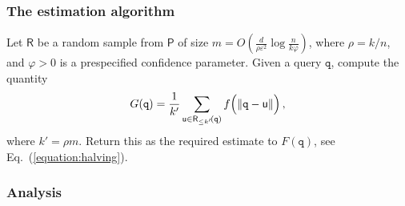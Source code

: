 \documentclass[12pt]{article}
\theoremstyle{remark}{\theorembodyfont{\rm} \newtheorem{remark}[theorem]{Remark}}
\newcommand{\eqlab}[1]{\label{equation:#1}}
\newcommand{\Eqref}[1]{Eq.~(\ref{equation:#1})}
\newcommand{\MakeBig}{\rule[-.2cm]{0cm}{0.4cm}}
\newcommand{\pth}[2][\!]{#1\left({#2}\right)}
\newcommand{\normY}[2]{\left\lVert {#1} - {#2} \right \rVert}
\newcommand{\eps}{{\varepsilon}}\newcommand{\divides}{|}
\newcommand{\PntSet}{\mathsf{P}}
\newcommand{\query}{\mathtt{q}}
\newcommand{\pntA}{\mathsf{u}}
\newcommand{\distY}[2]{\normY{#1}{#2}}
\newcommand{\ds}{\displaystyle}
\newcommand{\PkExt}[4][\!]{{#2}_{\leq #3}\pth[#1]{#4}}
\newcommand{\BadProb}{\varphi}
\newcommand{\prob}{\rho}
\newcommand{\RSample}{\mathsf{R}}
\begin{document}
\subsubsection{The estimation algorithm}

Let $\RSample$ be a random sample from $\PntSet$ of size $\ds m =
O\pth{ \frac{ d }{\prob \eps^2 } \log \frac{ n}{k \BadProb}}$, where
$\prob = k/n$, and $\BadProb>0$ is a prespecified confidence
parameter. Given a query $\query$, compute the quantity
\begin{align}
    G(\query)=\frac{1}{k'}\sum_{\pntA \in \PkExt{\RSample}{k'}{\query}}
    f\pth{\distY{\query}{\pntA} \MakeBig\! } ,\eqlab{estimate}\end{align}
where $k'= \prob m$. Return this as the required estimate to
$F(\query)$, see \Eqref{halving}.


\subsubsection{Analysis}
\end{document}
